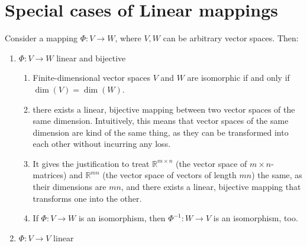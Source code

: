 \section{Special cases of Linear mappings}

Consider a mapping $\Phi : V \to W$, where $V, W$ can be arbitrary vector spaces. 
Then:
\hfill \cite{mfml/book/mml/Deisenroth-Faisal-Ong}

\begin{enumerate}
    \item 
    \begin{definition}[Isomorphism]
        $\Phi : V \to W$ linear and bijective
        \hfill \cite{mfml/book/mml/Deisenroth-Faisal-Ong}
    \end{definition}
    \begin{enumerate}
        \item
        \begin{theorem}
            Finite-dimensional vector spaces $V$ and $W$ are isomorphic if and only if $\dim(V ) = \dim(W)$.
            \hfill \cite{mfml/book/mml/Deisenroth-Faisal-Ong}
        \end{theorem}

        \item there exists a linear, bijective mapping between two vector spaces of the same dimension.
        Intuitively, this means that vector spaces of the same dimension are kind of the same thing, as they can be transformed into each other without incurring any loss.
        \hfill \cite{mfml/book/mml/Deisenroth-Faisal-Ong}

        \item It gives the justification to treat $\mathbb{R}^{m\times n}$ (the vector space of $m \times n$-matrices) and $\mathbb{R}^{mn}$ (the vector space of vectors of length $mn$) the same, as their dimensions are $mn$, and there exists a linear, bijective mapping that transforms one into the other.
        \hfill \cite{mfml/book/mml/Deisenroth-Faisal-Ong}

        \item If $\Phi : V \to W$ is an isomorphism, then $\Phi ^{-1} : W \to V$ is an isomorphism, too.
        \hfill \cite{mfml/book/mml/Deisenroth-Faisal-Ong}
    \end{enumerate}

    \item 
    \begin{definition}[Endomorphism]
        $\Phi : V \to V$ linear
        \hfill \cite{mfml/book/mml/Deisenroth-Faisal-Ong}
    \end{definition}


\end{enumerate}
